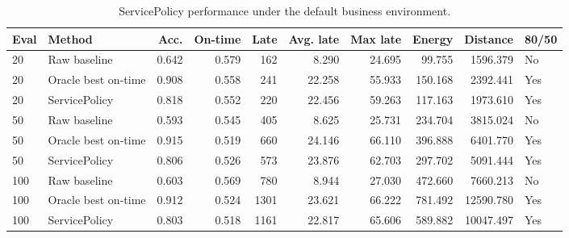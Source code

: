 \begin{table}[htbp]
\centering
\caption{ServicePolicy performance under the default business environment.}
\label{tab:service_policy_default_env}
\begin{tabular}{llrrrrrrrl}
\toprule
Eval & Method & Acc. & On-time & Late & Avg. late & Max late & Energy & Distance & 80/50 \\
\midrule
20 & Raw baseline & 0.642 & 0.579 & 162 & 8.290 & 24.695 & 99.755 & 1596.379 & No \\
20 & Oracle best on-time & 0.908 & 0.558 & 241 & 22.258 & 55.933 & 150.168 & 2392.441 & Yes \\
20 & ServicePolicy & 0.818 & 0.552 & 220 & 22.456 & 59.263 & 117.163 & 1973.610 & Yes \\
50 & Raw baseline & 0.593 & 0.545 & 405 & 8.625 & 25.731 & 234.704 & 3815.024 & No \\
50 & Oracle best on-time & 0.915 & 0.519 & 660 & 24.146 & 66.110 & 396.888 & 6401.770 & Yes \\
50 & ServicePolicy & 0.806 & 0.526 & 573 & 23.876 & 62.703 & 297.702 & 5091.444 & Yes \\
100 & Raw baseline & 0.603 & 0.569 & 780 & 8.944 & 27.030 & 472.660 & 7660.213 & No \\
100 & Oracle best on-time & 0.912 & 0.524 & 1301 & 23.621 & 66.222 & 781.492 & 12590.780 & Yes \\
100 & ServicePolicy & 0.803 & 0.518 & 1161 & 22.817 & 65.606 & 589.882 & 10047.497 & Yes \\
\bottomrule
\end{tabular}
\end{table}
